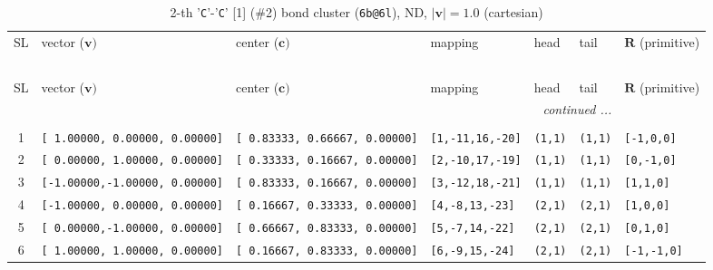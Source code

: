 \documentclass[fleqn,10pt,landscape]{jsarticle}
\begin{document}
\begin{longtable}[l]{cllllll}
\captionsetup{justification=raggedright, singlelinecheck=off}
\caption{2-th '\texttt{C}'-'\texttt{C}' [1] (\#2) bond cluster (\texttt{6b@6l}), ND, $|\bm{v}|=1.0$ (cartesian)}
 \\
 \hline \hline
SL & vector ($\bm{v})$ & center ($\bm{c})$ & mapping & head & tail & $\bm{R}$ (primitive) \\ \hline \endfirsthead

\multicolumn{6}{l}{\tablename\ \thetable{}} \\
 \hline \hline
SL & vector ($\bm{v})$ & center ($\bm{c})$ & mapping & head & tail & $\bm{R}$ (primitive) \\ \hline \endhead

 \hline \hline
\multicolumn{6}{r}{\footnotesize\it continued ...} \\ \endfoot

 \hline \hline
\multicolumn{6}{r}{} \\ \endlastfoot

1 & \texttt{[ 1.00000, 0.00000, 0.00000]} & \texttt{[ 0.83333, 0.66667, 0.00000]} & \texttt{[1,-11,16,-20]} & \texttt{(1,1)} & \texttt{(1,1)} & \texttt{[-1,0,0]} \\ \hline
2 & \texttt{[ 0.00000, 1.00000, 0.00000]} & \texttt{[ 0.33333, 0.16667, 0.00000]} & \texttt{[2,-10,17,-19]} & \texttt{(1,1)} & \texttt{(1,1)} & \texttt{[0,-1,0]} \\ \hline
3 & \texttt{[-1.00000,-1.00000, 0.00000]} & \texttt{[ 0.83333, 0.16667, 0.00000]} & \texttt{[3,-12,18,-21]} & \texttt{(1,1)} & \texttt{(1,1)} & \texttt{[1,1,0]} \\ \hline
4 & \texttt{[-1.00000, 0.00000, 0.00000]} & \texttt{[ 0.16667, 0.33333, 0.00000]} & \texttt{[4,-8,13,-23]} & \texttt{(2,1)} & \texttt{(2,1)} & \texttt{[1,0,0]} \\ \hline
5 & \texttt{[ 0.00000,-1.00000, 0.00000]} & \texttt{[ 0.66667, 0.83333, 0.00000]} & \texttt{[5,-7,14,-22]} & \texttt{(2,1)} & \texttt{(2,1)} & \texttt{[0,1,0]} \\ \hline
6 & \texttt{[ 1.00000, 1.00000, 0.00000]} & \texttt{[ 0.16667, 0.83333, 0.00000]} & \texttt{[6,-9,15,-24]} & \texttt{(2,1)} & \texttt{(2,1)} & \texttt{[-1,-1,0]} \\
\end{longtable}
\end{document}
